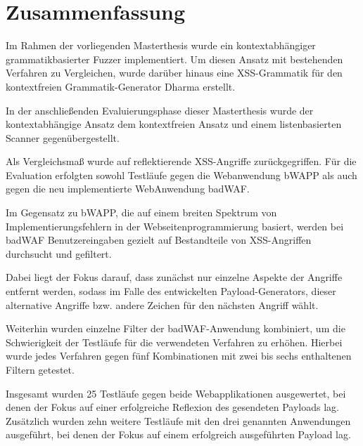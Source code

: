 \section{Zusammenfassung}\label{sec:summary}

Im Rahmen der vorliegenden Masterthesis wurde ein kontextabhängiger grammatikbasierter Fuzzer implementiert. Um diesen Ansatz mit bestehenden Verfahren zu Vergleichen, wurde darüber hinaus eine \ac{XSS}-Grammatik für den kontextfreien Grammatik-Generator Dharma erstellt. 

%
%

In der anschließenden Evaluierungsphase dieser Masterthesis wurde der kontextabhängige Ansatz dem kontextfreien Ansatz und einem listenbasierten Scanner gegenübergestellt.

Als Vergleichsmaß wurde auf reflektierende XSS-Angriffe zurückgegriffen. Für die Evaluation erfolgten sowohl Testläufe gegen die Webanwendung bWAPP als auch gegen die neu implementierte WebAnwendung badWAF.

Im Gegensatz zu bWAPP, die auf einem breiten Spektrum von Implementierungsfehlern in der Webseitenprogrammierung basiert, werden bei badWAF Benutzereingaben gezielt auf Bestandteile von XSS-Angriffen durchsucht und gefiltert.

Dabei liegt der Fokus darauf, dass zunächst nur einzelne Aspekte der Angriffe entfernt werden, sodass im Falle des entwickelten Payload-Generators, dieser alternative Angriffe bzw. andere Zeichen für den nächsten Angriff wählt.

Weiterhin wurden einzelne Filter der badWAF-Anwendung kombiniert, um die Schwierigkeit der Testläufe für die verwendeten Verfahren zu erhöhen. Hierbei wurde jedes Verfahren gegen fünf Kombinationen mit zwei bis sechs enthaltenen Filtern getestet.

Insgesamt wurden 25 Testläufe gegen beide Webapplikationen ausgewertet, bei denen der Fokus auf einer erfolgreiche Reflexion des gesendeten Payloads lag. Zusätzlich wurden zehn weitere Testläufe mit den drei genannten Anwendungen ausgeführt, bei denen der Fokus auf einem erfolgreich ausgeführten Payload lag.

